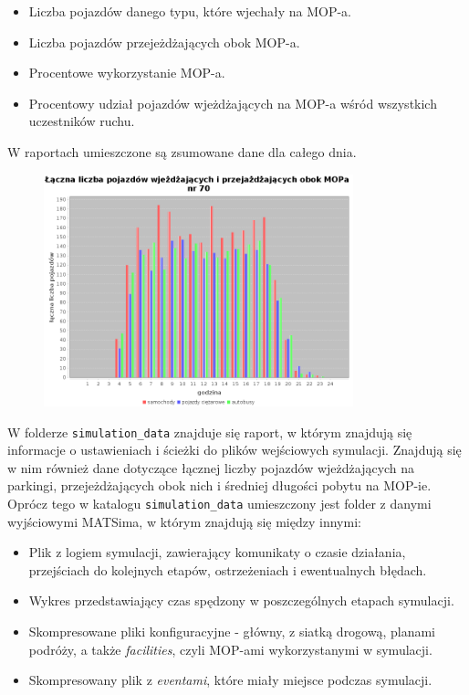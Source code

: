 \begin{itemize}
\item Liczba pojazdów danego typu, które wjechały na MOP-a.
\item Liczba pojazdów przejeżdżających obok MOP-a.
\item Procentowe wykorzystanie MOP-a.
\item Procentowy udział pojazdów wjeżdżających na MOP-a wśród wszystkich uczestników ruchu.
\end{itemize}
W raportach umieszczone są zsumowane dane dla całego dnia.
    \begin{figure}[h]
        \centering
        \includegraphics[width=0.8\textwidth]{images/mopsim/passingVehicles.png}
    \end{figure}
W folderze \texttt{simulation\_data} znajduje się raport, w którym znajdują się informacje o ustawieniach i ścieżki do plików wejściowych symulacji. Znajdują się w nim również dane dotyczące łącznej liczby pojazdów wjeżdżających na parkingi, przejeżdżających obok nich i
średniej długości pobytu na MOP-ie. Oprócz tego w katalogu \texttt{simulation\_data} umieszczony jest folder z danymi wyjściowymi MATSima, w którym znajdują się między innymi:
\begin{itemize}
\item Plik z logiem symulacji, zawierający komunikaty o czasie działania, przejściach do kolejnych etapów, ostrzeżeniach i ewentualnych błędach.
\item Wykres przedstawiający czas spędzony w poszczególnych etapach symulacji.
\item Skompresowane pliki konfiguracyjne - główny, z siatką drogową, planami podróży, a także \textit{facilities}, czyli MOP-ami wykorzystanymi w symulacji.
\item Skompresowany plik z \textit{eventami}, które miały miejsce podczas symulacji.
\end{itemize}
